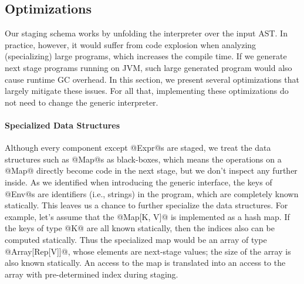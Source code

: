 \subsection{Optimizations} \label{staged_ds}

\iffalse
Revision: Solving Practical Challenges.
theoretically, all the things should work nicely. Unfolding the interpreter over the AST.
But the generated code is blowed up. For example .... This should not affect the correctness,
but poses burden on the MSP system (ie LMS) and the next stage compiler/runtime (ie, scalac and JVM).
1) LMS becomes slower since a large IR graph is contructed during the staging.
2) Scalac becomes slower when reading a such large source code.
JVM has certain limitation on the size of a single method.

TODO: can we formulate selective caching as a partially-static data law.
TODO: lambda lifting for if
\fi

Our staging schema works by unfolding the interpreter over the input AST. In
practice, however, it would suffer from code explosion when analyzing
(specializing) large programs, which increases the compile time. If we generate
next stage programs running on JVM, such large generated program would also
cause runtime GC overhead. In this section, we present several optimizations
that largely mitigate these issues. For all that, implementing these
optimizations do not need to change the generic interpreter.

\paragraph{Specialized Data Structures}

Although every component except @Expr@s are staged, we treat the data
structures such as @Map@s as black-boxes, which means the operations on a @Map@
directly become code in the next stage, but we don't inspect any further inside.
As we identified when introducing the generic interface, the keys of @Env@s are
identifiers (i.e., strings) in the program, which are completely known
statically. This leaves us a chance to further specialize the data structures.
For example, let's assume that the @Map[K, V]@ is implemented as a hash map. If
the keys of type @K@ are all known statically, then the indices also can be
computed statically. Thus the specialized map would be an array of type
@Array[Rep[V]]@, whose elements are next-stage values; the size of the array is
also known statically. An access to the map is translated into an access to the
array with pre-determined index during staging.

